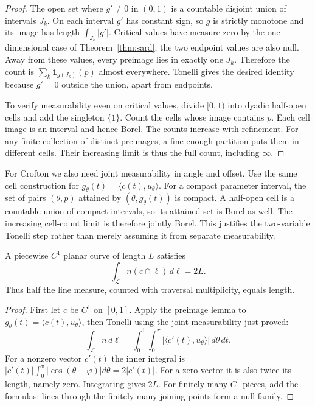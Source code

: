 \begin{proof}
The open set where $g'\ne0$ in $(0,1)$ is a countable disjoint union of intervals $J_k$. On each interval $g'$ has constant sign, so $g$ is strictly monotone and its image has length $\int_{J_k}|g'|$. Critical values have measure zero by the one-dimensional case of Theorem~\ref{thm:sard}; the two endpoint values are also null. Away from these values, every preimage lies in exactly one $J_k$. Therefore the count is $\sum_k\mathbf1_{g(J_k)}(p)$ almost everywhere. Tonelli gives the desired identity because $g'=0$ outside the union, apart from endpoints.

To verify measurability even on critical values, divide $[0,1)$ into dyadic half-open cells and add the singleton $\{1\}$. Count the cells whose image contains $p$. Each cell image is an interval and hence Borel. The counts increase with refinement. For any finite collection of distinct preimages, a fine enough partition puts them in different cells. Their increasing limit is thus the full count, including $\infty$.
\end{proof}

For Crofton we also need joint measurability in angle and offset. Use the same cell construction for $g_\theta(t)=\langle c(t),u_\theta\rangle$. For a compact parameter interval, the set of pairs $(\theta,p)$ attained by $(\theta,g_\theta(t))$ is compact. A half-open cell is a countable union of compact intervals, so its attained set is Borel as well. The increasing cell-count limit is therefore jointly Borel. This justifies the two-variable Tonelli step rather than merely assuming it from separate measurability.

\begin{theorem}[Crofton, 1868]\label{thm:crofton}
A piecewise $C^1$ planar curve of length $L$ satisfies
\[
\int_{\mathcal L}n(c\cap\ell)\,d\ell=2L.
\]
Thus half the line measure, counted with traversal multiplicity, equals length.
\end{theorem}

\begin{proof}
First let $c$ be $C^1$ on $[0,1]$. Apply the preimage lemma to $g_\theta(t)=\langle c(t),u_\theta\rangle$, then Tonelli using the joint measurability just proved:
\[
\int_{\mathcal L}n\,d\ell
=\int_0^1\int_0^\pi|\langle c'(t),u_\theta\rangle|\,d\theta\,dt.
\]
For a nonzero vector $c'(t)$ the inner integral is $|c'(t)|\int_0^\pi|\cos(\theta-\varphi)|d\theta=2|c'(t)|$. For a zero vector it is also twice its length, namely zero. Integrating gives $2L$. For finitely many $C^1$ pieces, add the formulas; lines through the finitely many joining points form a null family.
\end{proof}

